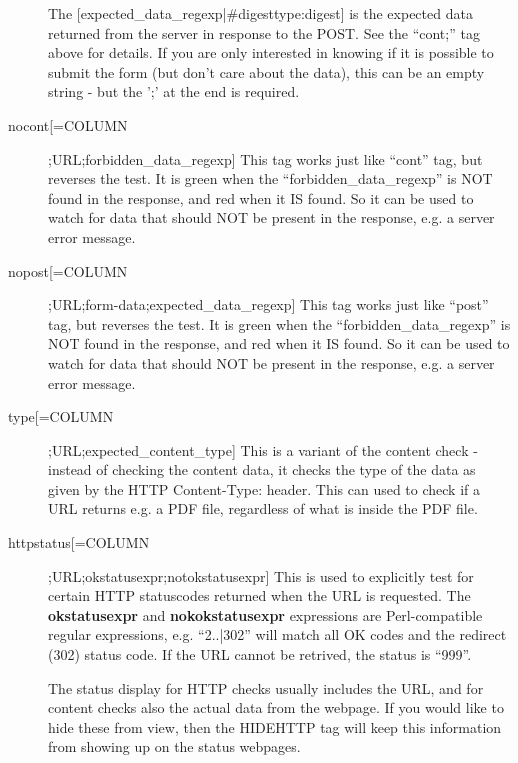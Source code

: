 \begin{description}
  The [expected\_data\_regexp|\#digesttype:digest] is the expected
  data returned from the server in response to the POST. See the
  ``cont;'' tag above for details. If you are only interested in
  knowing if it is possible to submit the form (but don't care about
  the data), this can be an empty string - but the ';' at the end is
  required. 



 

\item[nocont[=COLUMN];URL;forbidden\_data\_regexp] This tag works just
  like ``cont'' tag, but reverses the test. It is green when the
  ``forbidden\_data\_regexp'' is NOT found in the response, and red
  when it IS found. So it can be used to watch for data that should
  NOT be present in the response, e.g. a server error message. 


 

\item[nopost[=COLUMN];URL;form-data;expected\_data\_regexp] This tag
  works just like ``post'' tag, but reverses the test. It is green
  when the ``forbidden\_data\_regexp'' is NOT found in the response,
  and red when it IS found. So it can be used to watch for data that
  should NOT be present in the response, e.g. a server error message. 


 

\item[type[=COLUMN];URL;expected\_content\_type] This is a variant of
  the content check - instead of checking the content data, it checks
  the type of the data as given by the HTTP Content-Type: header. This
  can used to check if a URL returns e.g. a PDF file, regardless of
  what is inside the PDF file. 


 

\item[httpstatus[=COLUMN];URL;okstatusexpr;notokstatusexpr] This is
  used to explicitly test for certain HTTP statuscodes returned when
  the URL is requested. The \textbf{okstatusexpr} and
  \textbf{nokokstatusexpr} expressions are Perl-compatible regular
  expressions, e.g. ``2..|302'' will match all OK codes and the
  redirect (302) status code. If the URL cannot be retrived, the
  status is ``999''. 


 

\item[\index{HIDEHTTP}] The status display for HTTP checks usually includes
  the URL, and for content checks also the actual data from the
  webpage. If you would like to hide these from view, then the
  HIDEHTTP tag will keep this information from showing up on the
  status webpages. 



\end{description}
